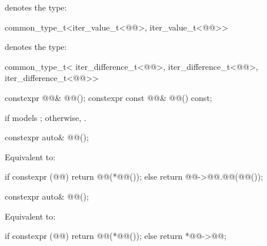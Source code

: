 \pnum
{} denotes the type:
\begin{codeblock}
common_type_t<iter_value_t<@@>, iter_value_t<@@>>
\end{codeblock}

\pnum
{} denotes the type:
\begin{codeblock}
common_type_t<
    iter_difference_t<@@>,
    iter_difference_t<@@>,
    iter_difference_t<@@>>
\end{codeblock}

\begin{itemdecl}
constexpr @@& @@();
constexpr const @@& @@() const;
\end{itemdecl}

\begin{itemdescr}
\pnum
\returns
{} if  models ;
otherwise, .
\end{itemdescr}

\begin{itemdecl}
constexpr auto& @@();
\end{itemdecl}

\begin{itemdescr}
\pnum
\effects
Equivalent to:
\begin{codeblock}
if constexpr (@@)
  return @@(*@@());
else
  return @@->@@.@@(@@());
\end{codeblock}
\end{itemdescr}

\begin{itemdecl}
constexpr auto& @@();
\end{itemdecl}

\begin{itemdescr}
\pnum
\effects
Equivalent to:
\begin{codeblock}
if constexpr (@@)
  return @@(*@@());
else
  return *@@->@@;
\end{codeblock}
\end{itemdescr}

